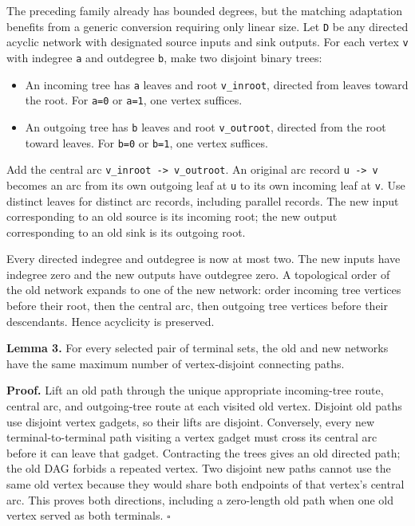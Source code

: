 The preceding family already has bounded degrees, but the matching adaptation benefits from a generic conversion requiring only linear size. Let \texttt{D} be any directed acyclic network with designated source inputs and sink outputs. For each vertex \texttt{v} with indegree \texttt{a} and outdegree \texttt{b}, make two disjoint binary trees:

\begin{itemize}
\tightlist
\item
  An incoming tree has \texttt{a} leaves and root \texttt{v\_inroot}, directed from leaves toward the root. For \texttt{a=0} or \texttt{a=1}, one vertex suffices.
\item
  An outgoing tree has \texttt{b} leaves and root \texttt{v\_outroot}, directed from the root toward leaves. For \texttt{b=0} or \texttt{b=1}, one vertex suffices.
\end{itemize}

Add the central arc \texttt{v\_inroot\ -\textgreater{}\ v\_outroot}. An original arc record \texttt{u\ -\textgreater{}\ v} becomes an arc from its own outgoing leaf at \texttt{u} to its own incoming leaf at \texttt{v}. Use distinct leaves for distinct arc records, including parallel records. The new input corresponding to an old source is its incoming root; the new output corresponding to an old sink is its outgoing root.

Every directed indegree and outdegree is now at most two. The new inputs have indegree zero and the new outputs have outdegree zero. A topological order of the old network expands to one of the new network: order incoming tree vertices before their root, then the central arc, then outgoing tree vertices before their descendants. Hence acyclicity is preserved.

\textbf{Lemma 3.} For every selected pair of terminal sets, the old and new networks have the same maximum number of vertex-disjoint connecting paths.

\textbf{Proof.} Lift an old path through the unique appropriate incoming-tree route, central arc, and outgoing-tree route at each visited old vertex. Disjoint old paths use disjoint vertex gadgets, so their lifts are disjoint. Conversely, every new terminal-to-terminal path visiting a vertex gadget must cross its central arc before it can leave that gadget. Contracting the trees gives an old directed path; the old DAG forbids a repeated vertex. Two disjoint new paths cannot use the same old vertex because they would share both endpoints of that vertex's central arc. This proves both directions, including a zero-length old path when one old vertex served as both terminals. \hfill\(\square\)

